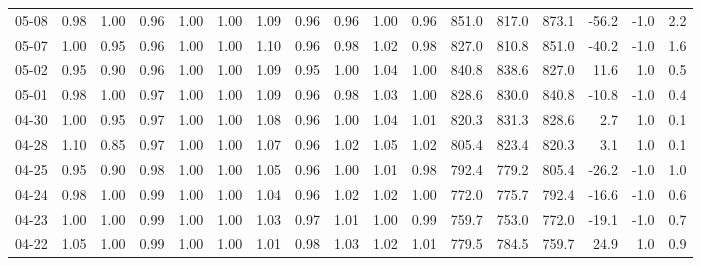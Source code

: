 \begin{threeparttable}
{\begin{tabular}{lrrrrrrrrrrrrrrrr}
  05-08 &   0.98 &   1.00 &         0.96 &     1.00 &           1.00 &        1.09 &        0.96 &        0.96 &          1.00 &          0.96 & 851.0 & 817.0 & 873.1 &      -56.2 &                     -1.0 &                 2.2 \\
  05-07 &   1.00 &   0.95 &         0.96 &     1.00 &           1.00 &        1.10 &        0.96 &        0.98 &          1.02 &          0.98 & 827.0 & 810.8 & 851.0 &      -40.2 &                     -1.0 &                 1.6 \\
  05-02 &   0.95 &   0.90 &         0.96 &     1.00 &           1.00 &        1.09 &        0.95 &        1.00 &          1.04 &          1.00 & 840.8 & 838.6 & 827.0 &       11.6 &                      1.0 &                 0.5 \\
  05-01 &   0.98 &   1.00 &         0.97 &     1.00 &           1.00 &        1.09 &        0.96 &        0.98 &          1.03 &          1.00 & 828.6 & 830.0 & 840.8 &      -10.8 &                     -1.0 &                 0.4 \\
  04-30 &   1.00 &   0.95 &         0.97 &     1.00 &           1.00 &        1.08 &        0.96 &        1.00 &          1.04 &          1.01 & 820.3 & 831.3 & 828.6 &        2.7 &                      1.0 &                 0.1 \\
  04-28 &   1.10 &   0.85 &         0.97 &     1.00 &           1.00 &        1.07 &        0.96 &        1.02 &          1.05 &          1.02 & 805.4 & 823.4 & 820.3 &        3.1 &                      1.0 &                 0.1 \\
  04-25 &   0.95 &   0.90 &         0.98 &     1.00 &           1.00 &        1.05 &        0.96 &        1.00 &          1.01 &          0.98 & 792.4 & 779.2 & 805.4 &      -26.2 &                     -1.0 &                 1.0 \\
  04-24 &   0.98 &   1.00 &         0.99 &     1.00 &           1.00 &        1.04 &        0.96 &        1.02 &          1.02 &          1.00 & 772.0 & 775.7 & 792.4 &      -16.6 &                     -1.0 &                 0.6 \\
  04-23 &   1.00 &   1.00 &         0.99 &     1.00 &           1.00 &        1.03 &        0.97 &        1.01 &          1.00 &          0.99 & 759.7 & 753.0 & 772.0 &      -19.1 &                     -1.0 &                 0.7 \\
  04-22 &   1.05 &   1.00 &         0.99 &     1.00 &           1.00 &        1.01 &        0.98 &        1.03 &          1.02 &          1.01 & 779.5 & 784.5 & 759.7 &       24.9 &                      1.0 &                 0.9 \\

\end{tabular}}
\end{threeparttable}
